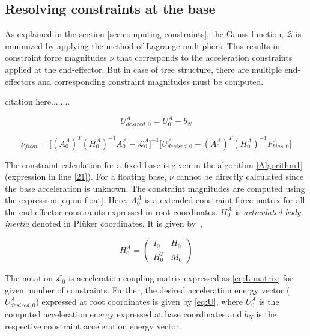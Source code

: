 \subsection{Resolving constraints at the base}

As explained in the section \ref{sec:computing-constraints}, the Gauss function, $\mathcal{Z}$ is minimized by applying the method of Lagrange multipliers. This results in constraint force magnitudes $\nu$ that corresponds to the acceleration constraints applied at the end-effector. But in case of tree structure, there are multiple end-effectors and corresponding constraint magnitudes must be computed. 



{\color{red} citation here........}

\begin{equation}\label{eq:U}
	U_{desired, 0}^A = U_0^A - b_N 
\end{equation}

\begin{equation}\label{eq:nu-float}
	\nu_{float} = \big[ (A_0^A)^T (H_0^A)^{-1} A_0^A - \mathcal{L}_0^A \big]^{-1} \big[ U_{desired, 0}^A - (A_0^A)^T (H_0^A)^{-1} F_{bias, 0}^A \big]
\end{equation}


The constraint calculation for a fixed base is given in the algorithm \ref{Algorithm1} (expression in line \ref{21}). For a floating base, $\nu$ cannot be directly calculated since the base acceleration is unknown. The constraint magnitudes are computed using the expression \ref{eq:nu-float}. Here, $A_0^A$ is a extended constraint force matrix for all the end-effector constraints expressed in root coordinates. $H_0^A$ is \textit{articulated-body inertia} denoted in Pl{\"u}ker coordinates. It is given by~\cite{featherstone2014rigid},

\begin{equation}
	\label{eq:RBI}
	H_0^A = \begin{pmatrix}
		I_0 & H_0 \\
		H_0^T & M_0
	\end{pmatrix}
\end{equation}

The notation $\mathcal{L}_0$ is acceleration coupling matrix expressed as \ref{eq:L-matrix} for given number of constraints. Further, the desired acceleration energy vector ($U_{desired, 0}^A$) expressed at root coordinates is given by \ref{eq:U}, where $U_0^A$ is the computed acceleration energy expressed at base coordinates and $b_N$ is the respective constraint acceleration energy vector. 


